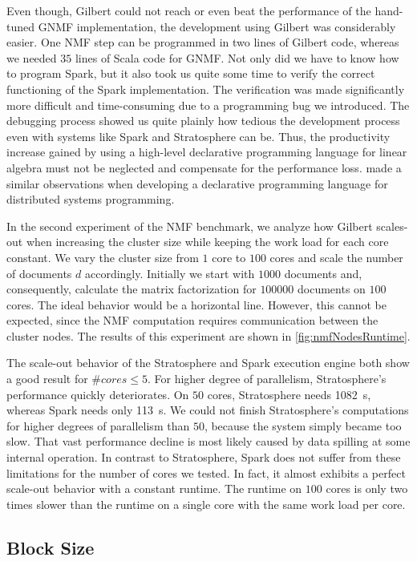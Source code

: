 Even though, Gilbert could not reach or even beat the performance of the hand-tuned GNMF implementation, the development using Gilbert was considerably easier.
One NMF step can be programmed in two lines of Gilbert code, whereas we needed $35$ lines of Scala code for GNMF.
Not only did we have to know how to program Spark, but it also took us quite some time to verify the correct functioning of the Spark implementation.
The verification was made significantly more difficult and time-consuming due to a programming bug we introduced.
The debugging process showed us quite plainly how tedious the development process even with systems like Spark and Stratosphere can be.
Thus, the productivity increase gained by using a high-level declarative programming language for linear algebra must not be neglected and compensate for the performance loss.
\Textcite{alvaro:2010a} made a similar observations when developing a declarative programming language for distributed systems programming.

In the second experiment of the NMF benchmark, we analyze how Gilbert scales-out when increasing the cluster size while keeping the work load for each core constant.
We vary the cluster size from $1$ core to $100$ cores and scale the number of documents $d$ accordingly.
Initially we start with $1000$ documents and, consequently, calculate the matrix factorization for $100000$ documents on $100$ cores.
The ideal behavior would be a horizontal line.
However, this cannot be expected, since the NMF computation requires communication between the cluster nodes.
The results of this experiment are shown in \cref{fig:nmfNodesRuntime}.

The scale-out behavior of the Stratosphere and Spark execution engine both show a good result for $\#cores \le 5$.
For higher degree of parallelism, Stratosphere's performance quickly deteriorates.
On $50$ cores, Stratosphere needs \SI{1082}{\second}, whereas Spark needs only \SI{113}{\second}.
We could not finish Stratosphere's computations for higher degrees of parallelism than $50$, because the system simply became too slow.
That vast performance decline is most likely caused by data spilling at some internal operation.
In contrast to Stratosphere, Spark does not suffer from these limitations for the number of cores we tested.
In fact, it almost exhibits a perfect scale-out behavior with a constant runtime.
The runtime on $100$ cores is only two times slower than the runtime on a single core with the same work load per core.

\subsection{Block Size}

